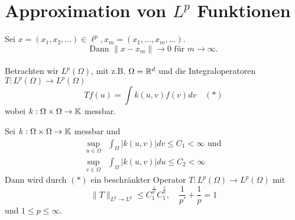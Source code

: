 
\section{Approximation von $L^{p}$ Funktionen}

Sei $x = (x_{1}, x_{2}, \dotsc) \in \ell^{p}, x_{m} = (x_{1}, \dotsc, x_{m}, \dotsc)$. \\
\[ \text{Dann }\|  x - x_{m} \| \rightarrow 0 \text{ für } m \rightarrow \infty. \]
\\
Betrachten wir $L^{p}(\Omega)$, mit z.B. $\Omega = \mathbb{R}^{d}$ und die Integraloperatoren $T :	L^{p}(\Omega) \rightarrow L^{p}(\Omega)$
	\[ T f(u) = \int k(u, v) f(v) dv \quad (*) \label{eq:8-beschrOperatorinLp} \]
wobei $k : \Omega \times \Omega \rightarrow \mathbb{K}$ messbar.

\begin{satz} \label{satz:8.1}
	Sei $k : \Omega \times \Omega \rightarrow \mathbb{K}$ messbar	und
	\begin{align*}
		\sup_{u \in \Omega} & \int_{\Omega} |k(u, v)| dv \leq C_{1} < \infty \text{ und} \\
		\sup_{v \in \Omega} & \int_{\Omega} |k(u, v)| du \leq C_{2} < \infty
	\end{align*}
	Dann wird durch \hyperref[eq:8-beschrOperatorinLp]{$(*)$} ein beschränkter Operator $T : L^{p}(\Omega) \rightarrow L^{p}(\Omega)$ mit
	\[ \| T \|_{L^{p} \rightarrow L^{p}} \leq C_{1}^{\frac{1}{p'}} C_{1}^{\frac{1}{p}}, \quad \frac{1}{p'} + \frac{1}{p} = 1   \]
	und $1 \leq p \leq \infty$.
\end{satz}

